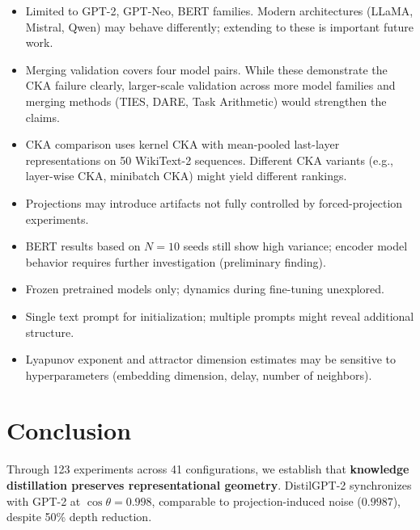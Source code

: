 \documentclass[10pt]{article} %
\theoremstyle{plain}
\theoremstyle{definition}
\theoremstyle{remark}
\begin{document}
\begin{itemize}
    \item Limited to GPT-2, GPT-Neo, BERT families. Modern architectures (LLaMA, Mistral, Qwen) may behave differently; extending to these is important future work.
    \item Merging validation covers four model pairs. While these demonstrate the CKA failure clearly, larger-scale validation across more model families and merging methods (TIES, DARE, Task Arithmetic) would strengthen the claims.
    \item CKA comparison uses kernel CKA with mean-pooled last-layer representations on 50 WikiText-2 sequences. Different CKA variants (e.g., layer-wise CKA, minibatch CKA) might yield different rankings.
    \item Projections may introduce artifacts not fully controlled by forced-projection experiments.
    \item BERT results based on $N=10$ seeds still show high variance; encoder model behavior requires further investigation (preliminary finding).
    \item Frozen pretrained models only; dynamics during fine-tuning unexplored.
    \item Single text prompt for initialization; multiple prompts might reveal additional structure.
    \item Lyapunov exponent and attractor dimension estimates may be sensitive to hyperparameters (embedding dimension, delay, number of neighbors).
\end{itemize}

\section{Conclusion}

Through 123 experiments across 41 configurations, we establish that \textbf{knowledge distillation preserves representational geometry}. DistilGPT-2 synchronizes with GPT-2 at $\cos \theta = 0.998$, comparable to projection-induced noise ($0.9987$), despite 50\% depth reduction.
\end{document}
